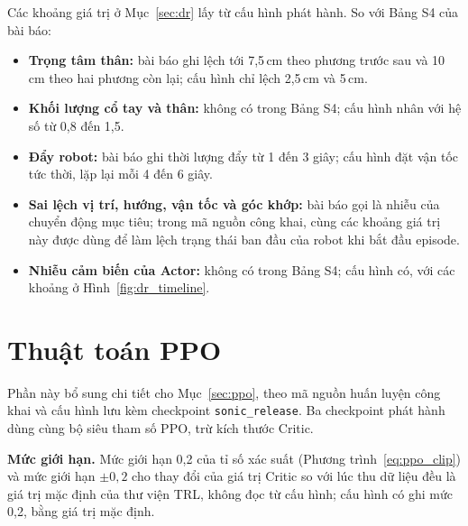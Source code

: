 \documentclass[12pt,a4paper,oneside]{report}
\newcommand{\code}[1]{\texttt{#1}}
\begin{document}
Các khoảng giá trị ở Mục~\ref{sec:dr} lấy từ cấu hình phát hành. So với Bảng S4 của bài báo:
\begin{itemize}
\item \textbf{Trọng tâm thân:} bài báo ghi lệch tới 7,5\,cm theo phương trước sau và 10\,cm theo hai phương còn lại; cấu hình chỉ lệch 2,5\,cm và 5\,cm.
\item \textbf{Khối lượng cổ tay và thân:} không có trong Bảng S4; cấu hình nhân với hệ số từ 0,8 đến 1,5.
\item \textbf{Đẩy robot:} bài báo ghi thời lượng đẩy từ 1 đến 3 giây; cấu hình đặt vận tốc tức thời, lặp lại mỗi 4 đến 6 giây.
\item \textbf{Sai lệch vị trí, hướng, vận tốc và góc khớp:} bài báo gọi là nhiễu của chuyển động mục tiêu; trong mã nguồn công khai, cùng các khoảng giá trị này được dùng để làm lệch trạng thái ban đầu của robot khi bắt đầu episode.
\item \textbf{Nhiễu cảm biến của Actor:} không có trong Bảng S4; cấu hình có, với các khoảng ở Hình~\ref{fig:dr_timeline}.
\end{itemize}

\section{Thuật toán PPO}
\label{app:ppo}

Phần này bổ sung chi tiết cho Mục~\ref{sec:ppo}, theo mã nguồn huấn luyện công khai và cấu hình lưu kèm checkpoint \code{sonic\_release}. Ba checkpoint phát hành dùng cùng bộ siêu tham số PPO, trừ kích thước Critic.

\textbf{Mức giới hạn.} Mức giới hạn 0,2 của tỉ số xác suất (Phương trình~\ref{eq:ppo_clip}) và mức giới hạn $\pm 0{,}2$ cho thay đổi của giá trị Critic so với lúc thu dữ liệu đều là giá trị mặc định của thư viện TRL, không đọc từ cấu hình; cấu hình có ghi mức 0,2, bằng giá trị mặc định.
\end{document}
